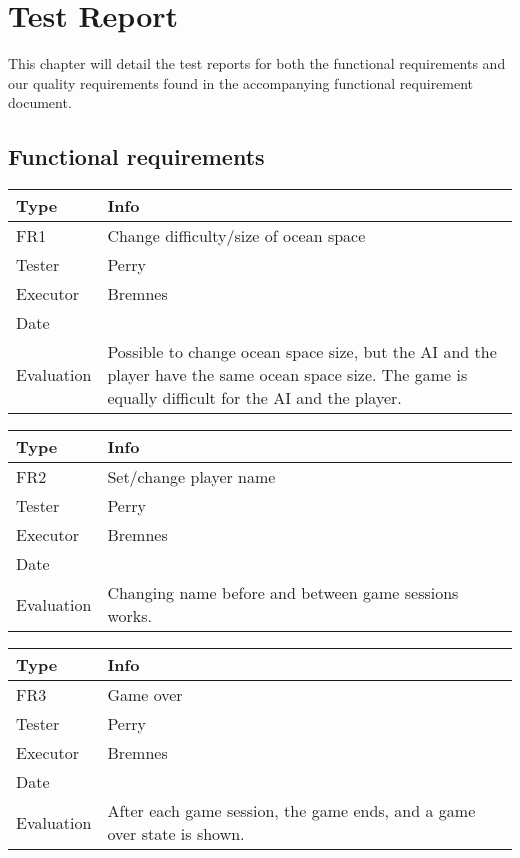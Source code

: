 \chapter{Test Report}
\label{cha:test_report}


This chapter will detail the test reports for both the functional requirements and our quality requirements found in the accompanying functional requirement document.


\section{Functional requirements}

\begin{tabular}{|p{2cm}|p{9.5cm}|}
	\hline
	\bf{Type}	& \bf{Info} \\
	\hline
	FR1			& Change difficulty/size of ocean space \\
	Tester		& Perry \\
	Executor	& Bremnes \\
	Date		& \date{\today} \\
	Evaluation	& Possible to change ocean space size, but the AI and the player have the same ocean space size. The game is equally difficult for the AI and the player. \\
	\hline
\end{tabular}

\vspace{0.5em}

\noindent
\begin{tabular}{|p{2cm}|p{9.5cm}|}
	\hline
	\bf{Type}	& \bf{Info} \\
	\hline
	FR2			& Set/change player name \\
	Tester		& Perry \\
	Executor	& Bremnes \\
	Date		& \date{\today} \\
	Evaluation	& Changing name before and between game sessions works. \\
	\hline
\end{tabular}

\vspace{0.5em}

\noindent
\begin{tabular}{|p{2cm}|p{9.5cm}|}
	\hline
	\bf{Type}	& \bf{Info} \\
	\hline
	FR3			& Game over \\
	Tester		& Perry \\
	Executor	& Bremnes \\
	Date		& \date{\today} \\
	Evaluation	& After each game session, the game ends, and a game over state is shown. \\
	\hline
\end{tabular}

